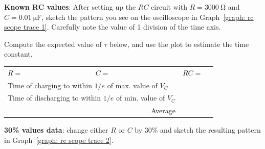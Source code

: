 \documentclass[addpoints]{physlabs}
\begin{document}
\begin{postlab}


    
    \filbreak
    \question[2] \textbf{Known RC values}: After setting up the $RC$ circuit with $R=\qty{3000}{\ohm}$ and $C=\qty{0.01}{\micro\farad}$, sketch the pattern you see on the oscilloscope in Graph~\ref{graph: rc scope trace 1}. Carefully note the value of 1 division of the time axis.

    \begin{center}
    \captionsetup{font=normalsize}
    
    \end{center}

    Compute the expected value of $\tau$ below, and use the plot to estimate the time constant.

    \begin{center}
        \renewcommand{\arraystretch}{2}
        \begin{tabular}{lp{2cm}clp{2cm}clp{3cm}}
            $R=$ & & & $C=$ & & & $RC=$ &
            \\
            \cline{2-2}\cline{5-5}\cline{8-8}
            \multicolumn{6}{l}{Time of charging to within $1/e$ of max. value of $V_C$} & &
            \\
            \cline{8-8}
            \multicolumn{6}{l}{Time of discharging to within $1/e$ of min. value of $V_C$} & &
            \\
            \cline{8-8}
            \multicolumn{6}{r}{Average} & &
            \\
            \cline{8-8}
        \end{tabular}
    \end{center}

    \filbreak
    \question[1] \textbf{30\% values data}: change either $R$ or $C$ by 30\% and sketch the resulting pattern in Graph~\ref{graph: rc scope trace 2}.

    \begin{center}
    \captionsetup{font=normalsize}
    
    \end{center}


\end{postlab}
\end{document}

